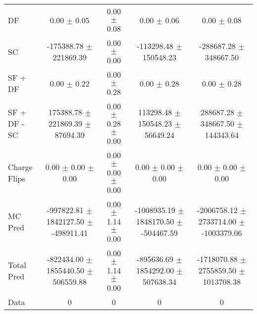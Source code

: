 \begin{tabular}{l|cccc}
                                 DF &  0.00 $\pm$  0.05 &  0.00 $\pm$  0.08 &  0.00 $\pm$  0.06 &  0.00 $\pm$  0.08 \\
                                 SC & -175388.78 $\pm$ 221869.39 &  0.00 $\pm$  0.00 & -113298.48 $\pm$ 150548.23 & -288687.28 $\pm$ 348667.50 \\
                            SF + DF &  0.00 $\pm$  0.22 &  0.00 $\pm$  0.28 &  0.00 $\pm$  0.28 &  0.00 $\pm$  0.28 \\
\hline
                       SF + DF - SC & 175388.78 $\pm$ 221869.39 $\pm$ 87694.39 &  0.00 $\pm$  0.28 $\pm$  0.00 & 113298.48 $\pm$ 150548.23 $\pm$ 56649.24 & 288687.28 $\pm$ 348667.50 $\pm$ 144343.64 \\
\hline\hline
                       Charge Flips &  0.00 $\pm$  0.00 $\pm$  0.00 &  0.00 $\pm$  0.00 $\pm$  0.00 &  0.00 $\pm$  0.00 $\pm$  0.00 &  0.00 $\pm$  0.00 $\pm$  0.00 \\
\hline
                            MC Pred & -997822.81 $\pm$ 1842127.50 $\pm$ -498911.41 &  0.00 $\pm$  1.14 $\pm$  0.00 & -1008935.19 $\pm$ 1848170.50 $\pm$ -504467.59 & -2006758.12 $\pm$ 2733714.00 $\pm$ -1003379.06 \\
\hline
                         Total Pred & -822434.00 $\pm$ 1855440.50 $\pm$ 506559.88 &  0.00 $\pm$  1.14 $\pm$  0.00 & -895636.69 $\pm$ 1854292.00 $\pm$ 507638.34 & -1718070.88 $\pm$ 2755859.50 $\pm$ 1013708.38 \\
\hline\hline
                               Data &     0 &     0 &     0 &     0 \\
\hline\hline
\end{tabular}


